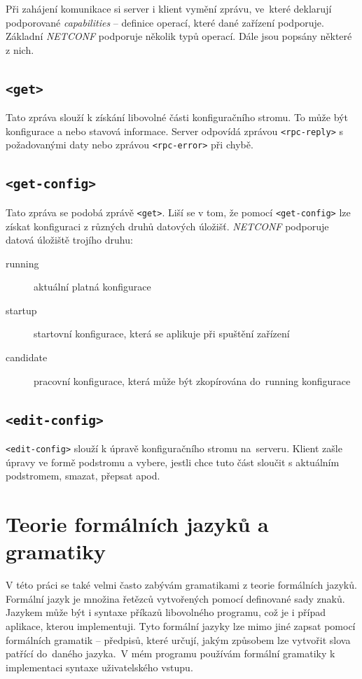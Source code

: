 \documentclass[thesis=B,czech,hidelinks]{FITthesis}[2019/03/06]
\begin{document}
Při zahájení komunikace si server i klient vymění  zprávu, ve~které deklarují podporované \textit{capabilities} -- definice operací, které dané zařízení podporuje. Základní \textit{NETCONF} podporuje několik typů operací. Dále jsou popsány některé z nich.

\subsection{\texttt{<get>}}
Tato zpráva slouží k získání libovolné části konfiguračního stromu. To může být konfigurace a nebo stavová informace. Server odpovídá zprávou \texttt{<rpc-reply>} s požadovanými daty nebo zprávou \texttt{<rpc-error>} při chybě.

\subsection{\texttt{<get-config>}}
Tato zpráva se podobá zprávě \texttt{<get>}. Liší se v tom, že pomocí \texttt{<get-config>} lze získat konfiguraci z různých druhů datových úložišť. \textit{NETCONF} podporuje datová úložiště trojího druhu:
\begin{description}
    \item[running]{aktuální platná konfigurace}
    \item[startup]{startovní konfigurace, která se aplikuje při spuštění zařízení}
    \item[candidate]{pracovní konfigurace, která může být zkopírována do~running konfigurace}
\end{description}

\subsection{\texttt{<edit-config>}}
\texttt{<edit-config>} slouží k úpravě konfiguračního stromu na~serveru. Klient zašle úpravy ve formě podstromu a vybere, jestli chce tuto část sloučit s aktuálním podstromem, smazat, přepsat apod.

\section{Teorie formálních jazyků a gramatiky}
V této práci se také velmi často zabývám gramatikami z teorie formálních jazyků. Formální jazyk je množina řetězců vytvořených pomocí definované sady znaků. Jazykem může být i syntaxe příkazů libovolného programu, což je i případ aplikace, kterou implementuji. Tyto formální jazyky lze mimo jiné zapsat pomocí formálních gramatik -- předpisů, které určují, jakým způsobem  lze vytvořit slova patřící do~daného jazyka.\,\cite{formal-languages} V mém programu používám formální gramatiky k implementaci syntaxe uživatelského vstupu.
\end{document}
